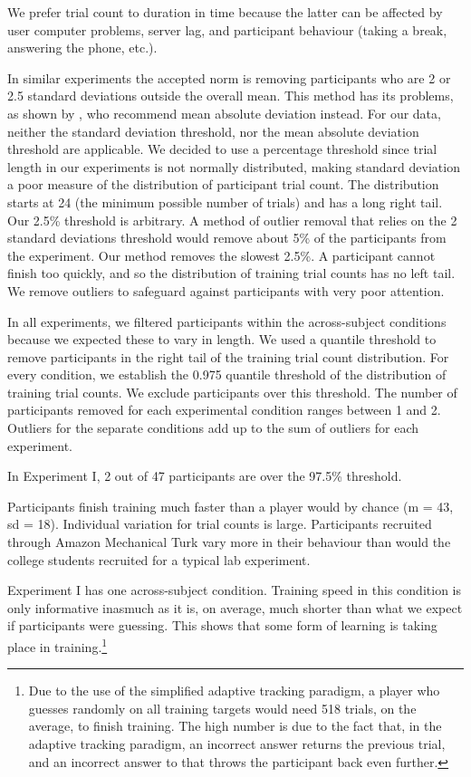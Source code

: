 \documentclass{frontiersSCNS} %
\begin{document}
We prefer trial count to duration in time because the latter can be affected by user computer problems, server lag, and participant behaviour (taking a break, answering the phone, etc.).


In similar experiments the accepted norm is removing participants who are 2 or 2.5 standard deviations outside the overall mean. This method has its problems, as shown by \cite{leys2013detecting}, who recommend mean absolute deviation instead. For our data, neither the standard deviation threshold, nor the mean absolute deviation threshold are applicable. We decided to use a percentage threshold since trial length in our experiments is not normally distributed, making standard deviation a poor measure of the distribution of participant trial count. The distribution starts at 24 (the minimum possible number of trials) and has a long right tail. Our 2.5\% threshold is arbitrary. A method of outlier removal that relies on the 2 standard deviations threshold would remove about 5\% of the participants from the experiment. Our method removes the slowest 2.5\%. A participant cannot finish too quickly, and so the distribution of training trial counts has no left tail. We remove outliers to safeguard against participants with very poor attention.

In all experiments, we filtered participants within the across-subject conditions because we expected these to vary in length. We used a quantile threshold to remove participants in the right tail of the training trial count distribution. For every condition, we establish the 0.975 quantile threshold of the distribution of training trial counts. We exclude participants over this threshold. The number of participants removed for each experimental condition ranges between 1 and 2. Outliers for the separate conditions add up to the sum of outliers for each experiment.

In Experiment I, 2 out of 47 participants are over the 97.5\% threshold. 


Participants finish training much faster than a player would by chance (m = 43, sd = 18). Individual variation for trial counts is large. Participants recruited through
Amazon Mechanical Turk vary more in their behaviour than would the college students recruited for a
typical lab experiment. 
 

Experiment I has one across-subject condition. Training speed in this condition is only informative inasmuch as it is, on average, much shorter than what we expect if participants were guessing. This shows that some form of learning is taking place in training.\footnote{Due to the use of the simplified
adaptive tracking paradigm, a player who guesses randomly on all training targets would need 518 trials,
on the average,
to finish training. The high number is due to the fact that, in the adaptive tracking paradigm, an incorrect answer returns the previous trial, and an incorrect answer to that throws the participant back even further.}
\end{document}

